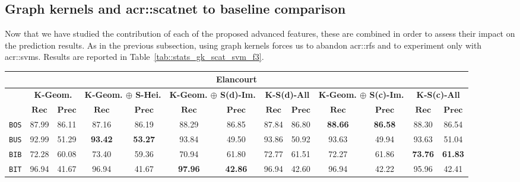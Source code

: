     \subsection{Graph kernels and \texorpdfstring{\acrshort*{acr::scatnet}}{ScatNet} to baseline comparison}
        \label{subsec::more_experiments::richer_features::graph_kernel_scatnet_baseline}
        Now that we have studied the contribution of each of the proposed advanced features, these are combined in order to assess their impact on the prediction results.
        As in the previous subsection, using graph kernels forces us to abandon \glspl{acr::rf} and to experiment only with \glspl{acr::svm}.
        Results are reported in Table~\ref{tab::stats_gk_scat_svm_f3}.\\
        
        \begin{sidewaystable}[htpb]
            \footnotesize
            \begin{tabular}{| c | c c | c c | c c | c c | c c | c c |}
                \hline
                \multicolumn{13}{|c|}{\textbf{Elancourt}}\\
                \hline
                &\multicolumn{2}{c|}{\textbf{K-Geom.}} & \multicolumn{2}{c|}{\textbf{K-Geom. \(\oplus\) S-Hei.}} & \multicolumn{2}{c|}{\textbf{K-Geom. \(\oplus\) S(d)-Im.}} & \multicolumn{2}{c|}{\textbf{K-S(d)-All}} & \multicolumn{2}{c|}{\textbf{K-Geom. \(\oplus\) S(c)-Im.}} & \multicolumn{2}{c|}{\textbf{K-S(c)-All}}\\
                \cline{2-13}
                & \(\bm{Rec}\) & \(\bm{Prec}\) &  \(\bm{Rec}\) & \(\bm{Prec}\) &  \(\bm{Rec}\) & \(\bm{Prec}\) &  \(\bm{Rec}\) & \(\bm{Prec}\) &  \(\bm{Rec}\) & \(\bm{Prec}\) &  \(\bm{Rec}\) & \(\bm{Prec}\) \\
                \hline
                \texttt{BOS} & 87.99 & 86.11 & 87.16 & 86.19 & 88.29 & 86.85 & 87.84 & 86.80 & \textbf{88.66} & \textbf{86.58} & 88.30 & 86.54 \\
                \hline
                \texttt{BUS} & 92.99 & 51.29 & \textbf{93.42} & \textbf{53.27} & 93.84 & 49.50 & 93.86 & 50.92 & 93.63 & 49.94 & 93.63 & 51.04 \\
                \hline
                \texttt{BIB} & 72.28 & 60.08 & 73.40 & 59.36 & 70.94 & 61.80 & 72.77 & 61.51 & 72.27 & 61.86 & \textbf{73.76} & \textbf{61.83} \\
                \hline
                \texttt{BIT} & 96.94 & 41.67 & 96.94 & 41.67 & \textbf{97.96} & \textbf{42.86} & 96.94 & 42.60 & 96.94 & 42.22 & 95.96 & 42.41 \\

\end{tabular}
\end{sidewaystable}
